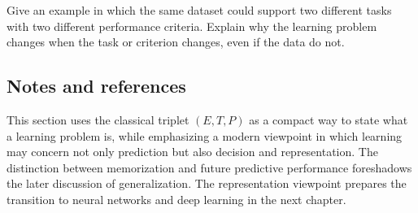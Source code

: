 \begin{exercise}
Give an example in which the same dataset could support two different tasks with two different performance criteria. Explain why the learning problem changes when the task or criterion changes, even if the data do not.
\end{exercise}

\subsection*{Notes and references}

This section uses the classical triplet $(E,T,P)$ as a compact way to state what a learning problem is, while emphasizing a modern viewpoint in which learning may concern not only prediction but also decision and representation. The distinction between memorization and future predictive performance foreshadows the later discussion of generalization. The representation viewpoint prepares the transition to neural networks and deep learning in the next chapter.